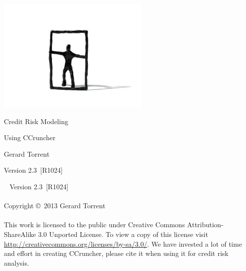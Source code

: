 \documentclass[11pt,fleqn]{book} %
\def\numversion{2.3}
\def\svnversion{R1024}
\begin{document}
\begingroup
\thispagestyle{empty}
\vspace*{-1cm}
\centerline{\includegraphics[angle=0]{./Pictures/logo.png}}
\centering
\vspace*{1cm}
\par\normalfont\fontsize{35}{35}\sffamily\selectfont
Credit Risk Modeling \par %
\par\normalfont\fontsize{25}{25}\sffamily\selectfont
Using CCruncher\par
\vspace*{2cm}
{\Huge Gerard Torrent}\par %
\vspace*{5cm}
\par\normalfont\fontsize{14}{14}\sffamily\selectfont
Version \numversion\ [\svnversion]\par
\endgroup


\newpage
~\vfill
\thispagestyle{empty}
\noindent Version \numversion\ [\svnversion]\\ 
\\
\noindent Copyright \copyright\ 2013 Gerard Torrent\\ %
\\
\noindent 
This work is licensed to the public under Creative Commons 
Attribution-ShareAlike 3.0 Unported License. To view a copy 
of this license visit 
\url{http://creativecommons.org/licenses/by-sa/3.0/}.
We have invested a lot of time and effort in creating CCruncher, 
please cite it when using it for credit risk analysis.
\end{document}
